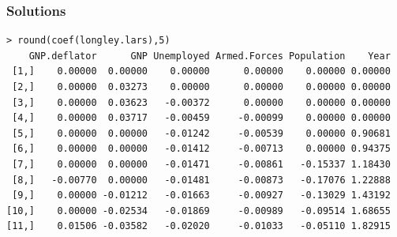\documentclass[handout]{beamer}
\begin{document}
\begin{frame}[fragile]
  \frametitle{Solutions}
{\fontsize{9pt}{10pt} \selectfont 
\begin{verbatim}
> round(coef(longley.lars),5)
    GNP.deflator      GNP Unemployed Armed.Forces Population    Year
 [1,]    0.00000  0.00000    0.00000      0.00000    0.00000 0.00000
 [2,]    0.00000  0.03273    0.00000      0.00000    0.00000 0.00000
 [3,]    0.00000  0.03623   -0.00372      0.00000    0.00000 0.00000
 [4,]    0.00000  0.03717   -0.00459     -0.00099    0.00000 0.00000
 [5,]    0.00000  0.00000   -0.01242     -0.00539    0.00000 0.90681
 [6,]    0.00000  0.00000   -0.01412     -0.00713    0.00000 0.94375
 [7,]    0.00000  0.00000   -0.01471     -0.00861   -0.15337 1.18430
 [8,]   -0.00770  0.00000   -0.01481     -0.00873   -0.17076 1.22888
 [9,]    0.00000 -0.01212   -0.01663     -0.00927   -0.13029 1.43192
[10,]    0.00000 -0.02534   -0.01869     -0.00989   -0.09514 1.68655
[11,]    0.01506 -0.03582   -0.02020     -0.01033   -0.05110 1.82915
\end{verbatim}
}
\end{frame}
\end{document}
